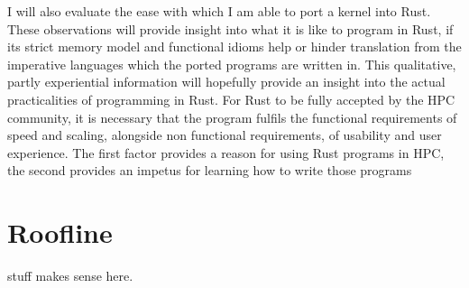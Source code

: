 I will also evaluate the ease with which I am able to port a kernel into Rust. These observations will provide insight into what it is like to program in Rust, if its strict memory model and functional idioms help or hinder translation from the imperative languages which the ported programs are written in. This qualitative, partly experiential information will hopefully provide an insight into the actual practicalities of programming in Rust. For Rust to be fully accepted by the HPC community, it is necessary that the program fulfils the functional requirements of speed and scaling, alongside non functional requirements, of usability and user experience. The first factor provides a reason for using Rust programs in HPC, the second provides an impetus for learning how to write those programs


\section{Roofline} stuff makes sense here.
